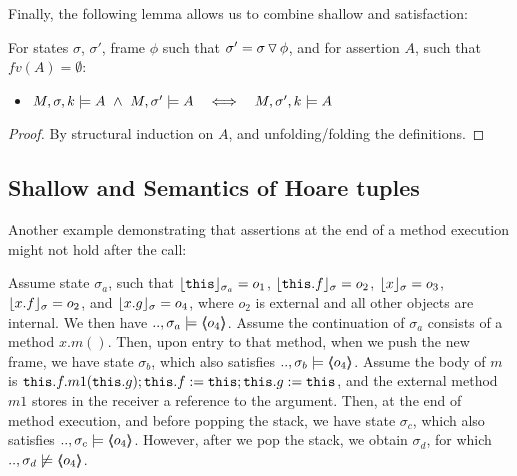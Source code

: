  
 
Finally, the following lemma allows us to combine shallow and \Strong satisfaction:

\begin{lemma}
\label{l:shallow:scoped:scoped}
For states  $\sigma$,  $\sigma'$, frame $\phi$ such that $\sigma'=\sigma  \pushSymbol \phi$, and for  
assertion $A$, such that $fv(A)=\emptyset$:
\begin{itemize}
\item
$\satDAssertFrom M  \sigma k A\   \wedge \ M, \sigma' \models A \ \ \ \Longleftrightarrow \ \ \   \satDAssertFrom M  {\sigma'} k  A$ 
\end{itemize}
\end{lemma}

\begin{proof}
By structural induction on $A$, and unfolding/folding the definitions.
\end{proof}




\subsection{Shallow and \Strong Semantics of Hoare tuples}
\label{s:shallow:deep:appendix}
Another example demonstrating that assertions at the end of a method execution might not hold after the call:

\begin{example}
\label{ex:motivate:scopes}
Assume state $\sigma_a$, such that $\interpret {\sigma_a} {\prg{this}}=o_1$, $\interpret {\sigma} {\prg{this}.f}=o_2$, $\interpret {\sigma} {x}=o_3$, $\interpret {\sigma} {x.f}=o_2$,  
and $\interpret {\sigma} {x.g}=o_4$, where $o_2$ is external and all other objects are internal. 
We then have $..,\sigma_a \models  \inside {o_4}$.
Assume %
 the continuation of $\sigma_a$   consists of a method $x.m()$. Then,
upon entry to that method, when we push the new frame, we have  state $\sigma_b$, which also satisfies $..,\sigma_b \models  \inside {o_4}$.
Assume %
 the   body of $m$ is $\prg{this}.f.m1(\prg{this}.g); \prg{this}.f := \prg{this};  \prg{this}.g := \prg{this}$, and %
 the external method $m1$ stores in the 
receiver a reference to the argument.
Then, at the end of method execution, and before popping the stack, we have   state $\sigma_c$, which also satisfies $..,\sigma_c \models  \inside {o_4}$.
However, after we pop the stack, we obtain $\sigma_d$, for which $..,\sigma_d \not\models  \inside {o_4}$.
\end{example} 


